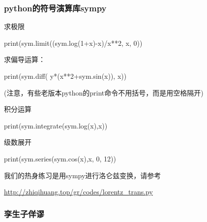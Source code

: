 \documentclass[CJK,13pt]{beamer}
\begin{document}
\begin{frame}
  \frametitle{python的符号演算库sympy}
  求极限
  
  {\darkgreen print(sym.limit((sym.log(1+x)-x)/x**2, x, 0))}

  \skipline
  
  求偏导运算：

 {\darkgreen print(sym.diff( y*(x**2+sym.sin(x)), x))}

  {\scriptsize (注意，有些老版本python的print命令不用括号，而是用空格隔开)}

  \skipline

  积分运算

  {\darkgreen  print(sym.integrate(sym.log(x),x))}

  \skipline

  级数展开
  
  {\darkgreen print(sym.series(sym.cos(x),x, 0, 12))}


  \skipline
  
  我们的热身练习是用sympy进行洛仑兹变换，请参考

  \url{http://zhiqihuang.top/gr/codes/lorentz_trans.py}
\end{frame}

\begin{frame}
  \frametitle{孪生子佯谬}
\end{frame}



\ech
\end{document}

